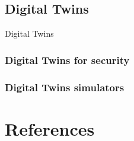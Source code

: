 \documentclass[12pt]{report}
\begin{document}
\section{Digital Twins}
\label{sec:bg:dt}
Digital Twins

\subsection{Digital Twins for security}
\label{sec:bg:dt:sec}
\subsection{Digital Twins simulators}
\label{sec:bg:dt:sim}

%
%
\chapter{References}



%
\end{document}
